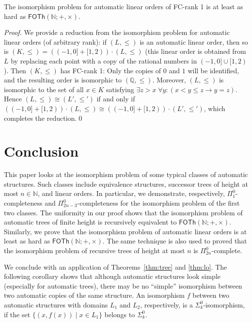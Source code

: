 \documentclass[envcountsame]{llncs}
\newcommand{\FOTh}{\mathsf{FOTh}}
\newcommand{\N}{\mathbb N}
\begin{document}
\begin{corollary}
  The isomorphism problem for automatic linear orders of FC-rank 1 is
  at least as hard as $\FOTh(\N;+,\times)$.
\end{corollary}

\begin{proof}
  We provide a reduction from the isomorphism problem for automatic
  linear orders (of arbitrary rank): if $(L,\le)$ is an automatic
  linear order, then so is $(K,\le)= ((-1,0]+[1,2)) \cdot (L,\le)$ (this
  linear order is obtained from $L$ by replacing each point with a
  copy of the rational numbers in $(-1,0]\cup[1,2)$). Then $(K,\le)$
  has FC-rank 1: Only the copies of $0$ and $1$ will be identified,
  and the resulting order is isomorphic to $(\mathbb{Q},\leq)$.
  Moreover, $(L,\le)$ is isomorphic to the set of all $x\in
  K$ satisfying $\exists z > x \; \forall y : (x<y\le z \to
  y=z)$. Hence $(L,\le)\cong(L',\le')$ if and only if
  $((-1,0]+[1,2)) \cdot (L,\le) \cong ((-1,0]+[1,2)) \cdot (L',\le')$, which
  completes the reduction.\qed
\end{proof}

\section{Conclusion}

This paper looks at the isomorphism problem of some typical classes of
automatic structures. Such classes include equivalence structures, successor
trees of height at most $n\in \N$, and linear orders. In particular, we
demonstrate, respectively, $\Pi^0_1$-completeness and $\Pi^0_{2n-3}$-completeness for the
isomorphism problem of the first two classes. The uniformity in our proof
shows that the isomorphism problem of automatic trees of finite height is
recursively equivalent to $\FOTh(\N;+,\times)$.
Similarly, we  prove that the isomorphism problem
of automatic linear orders is  at least as hard as $\FOTh(\N;+,\times)$.
The same technique is also used to proved that the isomorphism problem 
of recursive trees of height at most $n$ is $\Pi^0_{2n}$-complete. 

We conclude with an application of Theorems~\ref{thm:tree} and
\ref{thm:lo}. The following corollary shows that although automatic
structures look simple (especially for automatic trees), there may be
no ``simple'' isomorphism between two automatic copies of the same
structure. An isomorphism $f$ between two automatic structures
with domains $L_1$ and $L_2$, respectively, is 
a $\Sigma^0_k$-isomorphism, if the set $\{ (x,f(x)) \mid x \in L_1\}$
belongs to $\Sigma^0_k$.
\end{document}
